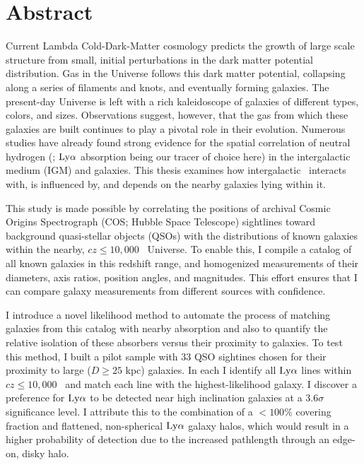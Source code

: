 \chapter*{Abstract}

Current Lambda Cold-Dark-Matter cosmology predicts the growth of large scale structure from small, initial perturbations in the dark matter potential distribution. Gas in the Universe follows this dark matter potential, collapsing along a series of filaments and knots, and eventually forming galaxies. The present-day Universe is left with a rich kaleidoscope of galaxies of different types, colors, and sizes. Observations suggest, however, that the gas from which these galaxies are built continues to play a pivotal role in their evolution. Numerous studies have already found strong evidence for the spatial correlation of neutral hydrogen (\HI; $\rm Ly\alpha$ absorption being our tracer of choice here) in the intergalactic medium (IGM) and galaxies. This thesis examines how intergalactic \HI~interacts with, is influenced by, and depends on the nearby galaxies lying within it. 


This study is made possible by correlating the positions of archival Cosmic Origins Spectrograph (COS; Hubble Space Telescope) sightlines toward background quasi-stellar objects (QSOs) with the distributions of known galaxies within the nearby, $cz \leq 10,000$ \kms~Universe. To enable this, I compile a catalog of all known galaxies in this redshift range, and homogenized measurements of their diameters, axis ratios, position angles, and magnitudes. This effort ensures that I can compare galaxy measurements from different sources with confidence. 

I introduce a novel likelihood method to automate the process of matching galaxies from this catalog with nearby absorption and also to quantify the relative isolation of these absorbers versus their proximity to galaxies. To test this method, I built a pilot sample with 33 QSO sightines chosen for their proximity to large ($D \ge 25$ kpc) galaxies. In each I identify all $\rm Ly\alpha$ lines within $cz \leq 10,000$ \kms~and match each line with the highest-likelihood galaxy. I discover a preference for $\rm Ly\alpha$ to be detected near high inclination galaxies at a $3.6\sigma$ significance level. I attribute this to the combination of a $< 100\%$ covering fraction and flattened, non-spherical $\rm Ly\alpha$ galaxy halos, which would result in a higher probability of detection due to the increased pathlength through an edge-on, disky halo.

